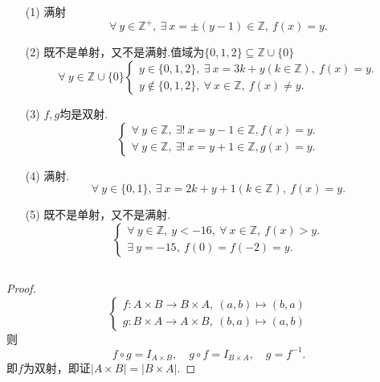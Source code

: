 \documentclass[UTF8]{ctexart}
\begin{document}
\subsection{}   %
\begin{enumerate}
    \item [(1)]满射
    \[
        \forall\ y\in \mathbb{Z}^{+},\ 
        \exists\ x=\pm(y-1)\in \mathbb{Z},\ 
        f(x)=y.    
    \]
    \item [(2)]既不是单射，又不是满射.值域为$\{0,1,2\}\subseteq \mathbb{Z}\cup\{0\}$
    \[
        \forall\ y\in \mathbb{Z}\cup\{0\}
        \begin{cases}
            y\in \{0,1,2\},\ \exists\ x=3k+y(k\in \mathbb{Z}),\ f(x)=y.\\
            y\notin \{0,1,2\},\ \forall\ x\in \mathbb{Z},\ f(x)\neq y.
        \end{cases}
    \]
    \item [(3)]$f,g$均是双射.
    \[
        \begin{cases}
            \forall\ y\in \mathbb{Z},\ \exists !\ x=y-1\in \mathbb{Z},f(x)=y.\\
            \forall\ y\in \mathbb{Z},\ \exists !\ x=y+1\in \mathbb{Z},g(x)=y. 
        \end{cases}    
    \]
    \item [(4)]满射.
    \[
        \forall\ y\in \{0,1\},\ 
        \exists\ x=2k+y+1(k\in\mathbb{Z}),\ f(x)=y.    
    \]
    \item [(5)]既不是单射，又不是满射.
    \[
        \begin{cases}
            \forall\ y\in \mathbb{Z},\ y<-16,\ \forall\ x\in\mathbb{Z},\ f(x)>y.\\
            \exists\ y=-15,\ f(0)=f(-2)=y.
        \end{cases}
    \]
\end{enumerate}

\subsection{}   %
\begin{proof}
    \[
        \begin{cases}
            f:A\times B \rightarrow B\times A,\ (a,b) \mapsto (b,a) \\
            g:B\times A \rightarrow A\times B,\ (b,a) \mapsto (a,b) 
        \end{cases}    
    \]
    则
    \[
        f\circ g = {I}_{A\times B},\quad
        g\circ f = {I}_{B\times A},\quad
        g=f^{-1}. 
    \]
    即$f$为双射，即证$|A\times B|=|B\times A|$.
\end{proof}
\end{document}
